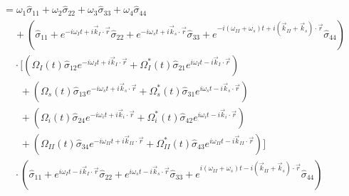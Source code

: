 \documentclass[aps,pra,showpacs,amsmath,amssymb,nofootinbib,longbibliography,superscriptaddress
]{revtex4-1}
\theoremstyle{definition}
\theoremstyle{remark}
\newcommand{\0}{\hat{0}}
\begin{document}
\begin{align}
    &= \omega_1 \hat{\sigma}_{11} + \omega_2 \hat{\sigma}_{22} + \omega_3 \hat{\sigma}_{33} + \omega_4 \hat{\sigma}_{44} \nonumber \\
    &\;\;\;\;+ \left(\hat{\sigma}_{11} + e^{-i \omega_I t + i \vec{k}_I \cdot \vec{r}} \hat{\sigma}_{22} + e^{-i \omega_s t + i \vec{k}_s \cdot \vec{r}} \hat{\sigma}_{33} + e^{-i(\omega_{II} + \omega_s) t + i(\vec{k}_{II} + \vec{k}_s) \cdot \vec{r}} \hat{\sigma}_{44}\right) \nonumber\\
    &\;\;\;\;\cdot \biggl[ \left(\Omega_{I}(t) \hat{\sigma}_{12} e^{-i \omega_I t + i \vec{k}_I \cdot \vec{r}} + \Omega_{I}^*(t) \hat{\sigma}_{21} e^{i \omega_I t - i \vec{k}_I \cdot \vec{r}}\right)\nonumber \\
    &\;\;\;\;\;\;+ \left(\Omega_{s}(t) \hat{\sigma}_{13} e^{-i \omega_s t + i \vec{k}_{s} \cdot \vec{r}} + \Omega_{s}^*(t) \hat{\sigma}_{31} e^{i \omega_s t - i \vec{k}_{s} \cdot \vec{r}}\right)\nonumber \\
    &\;\;\;\;\;\;+ \left(\Omega_{i}(t) \hat{\sigma}_{24} e^{-i \omega_i t + i \vec{k}_{i} \cdot \vec{r}} + \Omega_{i}^*(t) \hat{\sigma}_{42} e^{i \omega_i t - i \vec{k}_{i} \cdot \vec{r}}\right)\nonumber \\
    &\;\;\;\;\;\;+ \left(\Omega_{II}(t) \hat{\sigma}_{34} e^{-i \omega_{II} t + i \vec{k}_{II} \cdot \vec{r}} + \Omega_{II}^*(t) \hat{\sigma}_{43} e^{i \omega_{II} t - i \vec{k}_{II} \cdot \vec{r}}\right)\biggr] \nonumber \\
    &\;\;\;\; \cdot \left(\hat{\sigma}_{11} + e^{i \omega_I t - i \vec{k}_I \cdot \vec{r}} \hat{\sigma}_{22} + e^{i \omega_s t - i \vec{k}_s \cdot \vec{r}} \hat{\sigma}_{33} + e^{i(\omega_{II} + \omega_s) t - i(\vec{k}_{II} + \vec{k}_s) \cdot \vec{r}} \hat{\sigma}_{44}\right)
\end{align}
\end{document}
